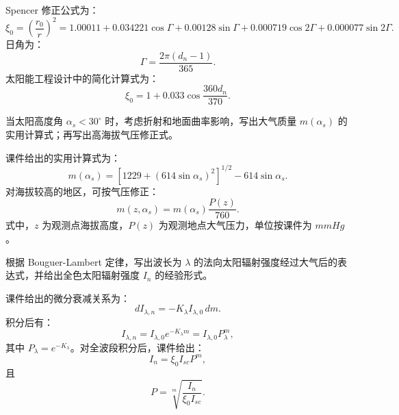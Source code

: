\begin{solution}
Spencer 修正公式为：
\begin{equation}
\xi_0
= \left(\frac{r_0}{r}\right)^2
= 1.00011 + 0.034221\cos\Gamma + 0.00128\sin\Gamma
+ 0.000719\cos2\Gamma + 0.000077\sin2\Gamma.
\end{equation}
日角为：
\begin{equation}
\Gamma = \frac{2\pi(d_n - 1)}{365}.
\end{equation}
太阳能工程设计中的简化计算式为：
\begin{equation}
\xi_0 = 1 + 0.033\cos\frac{360d_n}{370}.
\end{equation}
\end{solution}

\begin{problem}[大气质量计算]\label{exer:calc_04_solar_p028_01}
当太阳高度角 \(\alpha_s < 30^\circ\) 时，考虑折射和地面曲率影响，写出大气质量 \(m(\alpha_s)\) 的实用计算式；再写出高海拔气压修正式。
\end{problem}

\begin{solution}
课件给出的实用计算式为：
\begin{equation}
m(\alpha_s)
= \left[1229 + (614\sin\alpha_s)^2\right]^{1/2}
- 614\sin\alpha_s.
\end{equation}
对海拔较高的地区，可按气压修正：
\begin{equation}
m(z,\alpha_s)
= m(\alpha_s)\frac{P(z)}{760}.
\end{equation}
式中，\(z\) 为观测点海拔高度，\(P(z)\) 为观测地点大气压力，单位按课件为 \(\unit{mmHg}\)。
\end{solution}

\begin{problem}[大气透明度与法向太阳辐射强度]\label{exer:calc_04_solar_p029_01}
根据 Bouguer-Lambert 定律，写出波长为 \(\lambda\) 的法向太阳辐射强度经过大气后的表达式，并给出全色太阳辐射强度 \(I_n\) 的经验形式。
\end{problem}

\begin{solution}
课件给出的微分衰减关系为：
\begin{equation}
dI_{\lambda,n} = -K_\lambda I_{\lambda,0}\,dm.
\end{equation}
积分后有：
\begin{equation}
I_{\lambda,n} = I_{\lambda,0}e^{-K_\lambda m}
= I_{\lambda,0}P_\lambda^m,
\end{equation}
其中 \(P_\lambda = e^{-K_\lambda}\)。对全波段积分后，课件给出：
\begin{equation}
I_n = \xi_0 I_{sc}P^m,
\end{equation}
且
\begin{equation}
P = \sqrt[m]{\frac{I_n}{\xi_0 I_{sc}}}.
\end{equation}
\end{solution}

